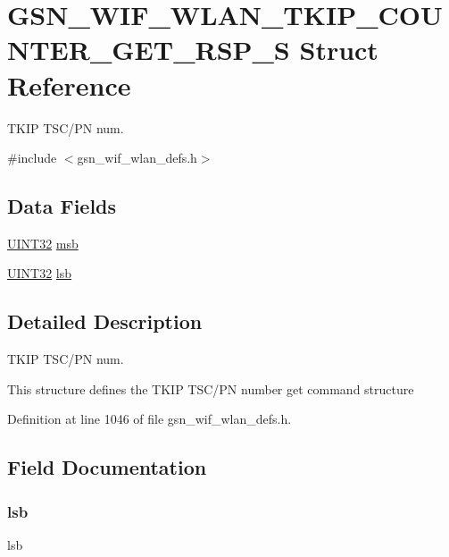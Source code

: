 \hypertarget{a00407}{
\section{GSN\_\-WIF\_\-WLAN\_\-TKIP\_\-COUNTER\_\-GET\_\-RSP\_\-S Struct Reference}
\label{a00407}
}


TKIP TSC/PN num.  




{\ttfamily \#include $<$gsn\_\-wif\_\-wlan\_\-defs.h$>$}

\subsection*{Data Fields}
\begin{DoxyCompactItemize}
\item 
\hyperlink{a00660_gae1e6edbbc26d6fbc71a90190d0266018}{UINT32} \hyperlink{a00407_aa040c0ef636ecd86ef03535060e13c3d}{msb}
\item 
\hyperlink{a00660_gae1e6edbbc26d6fbc71a90190d0266018}{UINT32} \hyperlink{a00407_af28f5d564ad36d1ac061e9b0f510e1b8}{lsb}
\end{DoxyCompactItemize}


\subsection{Detailed Description}
TKIP TSC/PN num. 

This structure defines the TKIP TSC/PN number get command structure 

Definition at line 1046 of file gsn\_\-wif\_\-wlan\_\-defs.h.



\subsection{Field Documentation}
\hypertarget{a00407_af28f5d564ad36d1ac061e9b0f510e1b8}{
\subsubsection[{lsb}]{ {\bf lsb}}}
\label{a00407_af28f5d564ad36d1ac061e9b0f510e1b8}
lsb 

